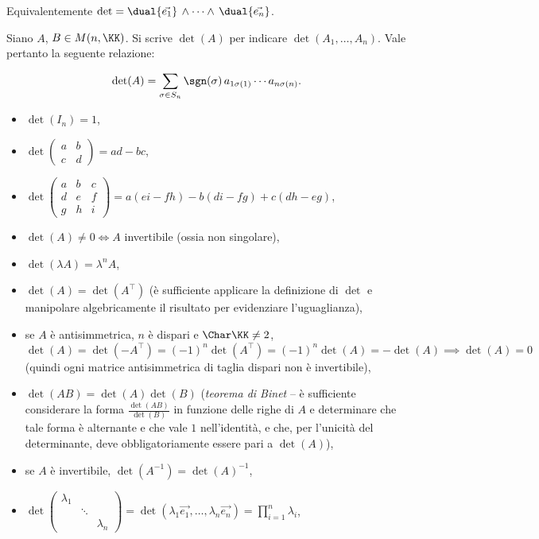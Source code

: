 \documentclass[10pt,landscape]{article}
\begin{document}
\begin{multicols}{3}
		Equivalentemente $\det = \dual{\vec{e_1}} \, \wedge \cdots \wedge \, \dual{\vec{e_n}}$.
		
		Siano $A$, $B \in M(n, \KK)$. Si scrive
		$\det(A)$ per indicare $\det(A_1, \ldots, A_n)$. Vale pertanto la
		seguente relazione:
		
		\[ \det(A) = \sum_{\sigma \in S_n} \sgn(\sigma) \, a_{1\sigma(1)} \cdots a_{n\sigma(n)}. \]
		
		\begin{itemize}
			\item $\det(I_n) = 1$,
			\item $\det \begin{pmatrix}
				a & b \\ c & d
			\end{pmatrix} = ad-bc$,
			\item $\det \begin{pmatrix}
				a & b & c \\ d & e & f \\ g & h & i
			\end{pmatrix} = a(ei-fh) - b(di-fg) + c(dh-eg)$,
			\item $\det(A) \neq 0 \iff A$ invertibile (ossia non singolare),
			\item $\det(\lambda A) = \lambda^n A$,
			\item $\det(A) = \det(A^\top)$ (è sufficiente applicare la definizione
			di $\det$ e manipolare algebricamente il risultato per evidenziare
			l'uguaglianza),
			\item se $A$ è antisimmetrica, $n$ è dispari e $\Char \KK \neq 2$,
			$\det(A) = \det(-A^\top) = (-1)^n \det(A^\top) = (-1)^n \det(A) = -\det(A) \implies \det(A) = 0$ (quindi ogni matrice antisimmetrica di taglia
			dispari non è invertibile),
			\item $\det(AB) = \det(A)\det(B)$ (\textit{teorema di Binet} -- è
			sufficiente considerare la forma $\frac{\det(AB)}{\det(B)}$ in
			funzione delle righe di $A$ e determinare che tale forma
			è alternante e che vale $1$ nell'identità, e che, per l'unicità
			del determinante, deve obbligatoriamente essere pari a
			$\det(A)$),
			\item se $A$ è invertibile, $\det(A^{-1}) = \det(A)^{-1}$,
			\item $\det   \begin{pmatrix}
				\lambda_{1} & & \\
				& \ddots & \\
				& & \lambda_{n}
			\end{pmatrix} = \det(\lambda_1 \vec{e_1}, \ldots, \lambda_n \vec{e_n}) = \prod_{i=1}^n \lambda_i$,

\end{itemize}
\end{multicols}
\end{document}

